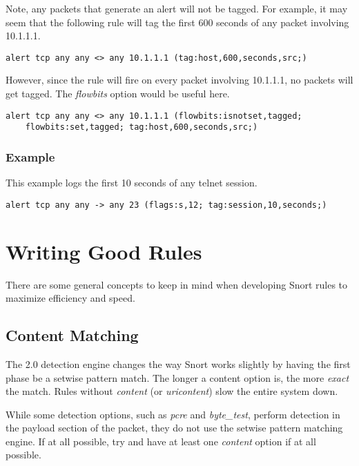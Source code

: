 \documentclass[english]{report}
\begin{document}
Note, any packets that generate an alert will not be tagged.  For example, it may seem that the following rule will tag the first 600 seconds of any packet involving 10.1.1.1.
\begin{verbatim}
alert tcp any any <> any 10.1.1.1 (tag:host,600,seconds,src;)
\end{verbatim}

However, since the rule will fire on every packet involving 10.1.1.1, no packets will get tagged.  The \emph{flowbits} option would be useful here.

\begin{verbatim}
alert tcp any any <> any 10.1.1.1 (flowbits:isnotset,tagged; 
    flowbits:set,tagged; tag:host,600,seconds,src;)
\end{verbatim}

\subsubsection{Example}

This example logs the first 10 seconds of any telnet session.
\begin{verbatim}
alert tcp any any -> any 23 (flags:s,12; tag:session,10,seconds;)
\end{verbatim}







\newpage
\section{Writing Good Rules}

There are some general concepts to keep in mind when developing Snort
rules to maximize efficiency and speed.

\subsection{Content Matching}
The 2.0 detection engine changes the way Snort works slightly by having the
first phase be a setwise pattern match.  The longer a content option is, the
more \emph{exact} the match.  Rules without \emph{content} (or
\emph{uricontent}) slow the entire system down.

While some detection options, such as \emph{pcre} and \emph{byte\_test},
perform detection in the payload section of the packet, they do not use the
setwise pattern matching engine.  If at all possible, try and have at least one
\emph{content} option if at all possible.
\end{document}
